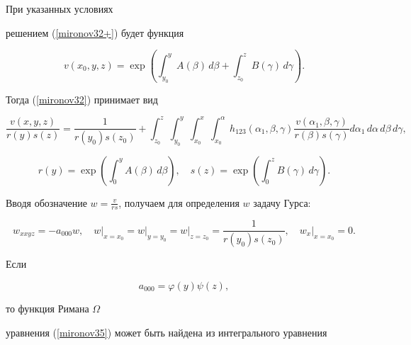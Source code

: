 При указанных условиях


решением (\ref{mironov32+}) будет функция


$$


v(x_0,y,z)=\exp\left( \int_{y_{0}}^{y} A(\beta)\,d\beta+


\int_{z_{0}}^{z} B(\gamma)\,d\gamma \right).


$$


Тогда (\ref{mironov32}) принимает вид


\begin{equation*}%


\frac{v(x, y, z)}{r(y)s(z)}=\frac{1}{r(y_{0})s(z_{0})}


+\int_{z_{0}}^{z}\int_{y_{0}}^{y}\int_{x_{0}}^{x}\int_{x_{0}}^{\alpha}


h_{123}(\alpha_{1},\beta,\gamma)


\frac{v(\alpha_{1},\beta,\gamma)}{r(\beta)s(\gamma)} d\alpha_{1}


\,d\alpha \,d\beta \,d\gamma,


\end{equation*}


$$


r(y)=\exp\left( \int_{0}^{y} A(\beta) \,d\beta \right),\quad


s(z)=\exp\left( \int_{0}^{z} B(\gamma) \,d\gamma \right).


$$


Вводя обозначение $w=\frac v{rs}$, получаем для определения $w$ задачу Гурса:


\begin{equation}\label{mironov35}


w_{xxyz}=-a_{000}w,\quad


w\big\vert_{x=x_{0}}=w\big\vert_{y=y_{0}}\!\!\!=w\big\vert_{z=z_{0}}\!\!\!


=\frac{1}{r(y_{0})s(z_{0})}, \quad w_{x}\big\vert_{x=x_{0}}\!\!\!=0.


\end{equation}


Если


\begin{equation}\label{mironov35+}


a_{000}=\varphi(y)\psi(z),


\end{equation}


то функция Римана $\Omega$


уравнения (\ref{mironov35}) может быть найдена из интегрального уравнения


